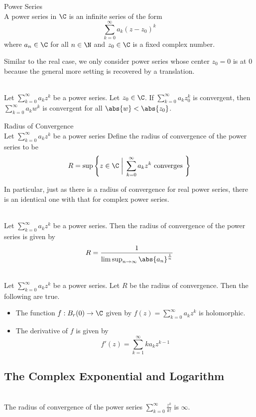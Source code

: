 \documentclass[a4paper]{article}
\begin{document}
\begin{defn}{Power Series}{}\\
A power series in $\C$ is an infinite series of the form $$\sum_{k=0}^{\infty}a_k(z-z_0)^k$$ where $a_n\in\C$ for all $n\in\N$ and $z_0\in\C$ is a fixed complex number. 
\end{defn}

Similar to the real case, we only consider power series whose center $z_0=0$ is at $0$ because the general more setting is recovered by a translation. 

\begin{prp}{}{}\\
Let $\sum_{k=0}^\infty a_kz^k$ be a power series. Let $z_0\in\C$. If $\sum_{k=0}^\infty a_kz_0^k$ is convergent, then $\sum_{k=0}^\infty a_kw^k$ is convergent for all $\abs{w}<\abs{z_0}$. 
\end{prp}

\begin{defn}{Radius of Convergence}{}\\
Let $\sum_{k=0}^\infty a_kz^k$ be a power series Define the radius of convergence of the power series to be $$R=\sup\left\{z\in\C\;\bigg{|}\;\sum_{k=0}^\infty a_kz^k\text{ converges }\right\}$$
\end{defn}

In particular, just as there is a radius of convergence for real power series, there is an identical one with that for complex power series. 

\begin{prp}{}{}\\
Let $\sum_{k=0}^\infty a_kz^k$ be a power series. Then the radius of convergence of the power series is given by $$R=\frac{1}{\limsup_{n\to\infty}\abs{a_n}^{\frac{1}{n}}}$$
\end{prp}

\begin{prp}{}{}\\
Let $\sum_{k=0}^\infty a_kz^k$ be a power series. Let $R$ be the radius of convergence. Then the following are true. 
\begin{itemize}
\item The function $f:B_r(0)\to\C$ given by $f(z)=\sum_{k=0}^\infty a_kz^k$ is holomorphic. 
\item The derivative of $f$ is given by $$f'(z)=\sum_{k=1}^\infty ka_kz^{k-1}$$
\end{itemize}
\end{prp}

\subsection{The Complex Exponential and Logarithm}
\begin{lmm}{}{}\\
The radius of convergence of the power series $\sum_{k=0}^\infty\frac{z^k}{k!}$ is $\infty$. 
\end{lmm}
\end{document}
